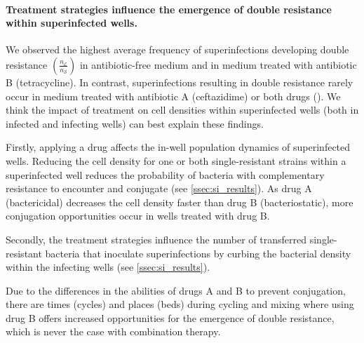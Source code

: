 \paragraph{Treatment strategies influence the emergence of double resistance within superinfected wells.}
We observed the highest average frequency of superinfections developing double resistance $(\frac{n_{\mathcal{E}}}{n_{\mathcal{S}}})$ in antibiotic-free medium and in medium treated with antibiotic B (tetracycline).
In contrast, superinfections resulting in double resistance rarely occur in medium treated with antibiotic A (ceftazidime) or both drugs ().
We think the impact of treatment on cell densities within superinfected wells (both in infected and infecting wells) can best explain these findings.

Firstly, applying a drug affects the in-well population dynamics of superinfected wells.
Reducing the cell density for one or both single-resistant strains within a superinfected well reduces the probability of bacteria with complementary resistance to encounter and conjugate (see \autoref{ssec:si_results}).
As drug A (bactericidal) decreases the cell density faster than drug B (bacteriostatic), more conjugation opportunities occur in wells treated with drug B.

Secondly, the treatment strategies influence the number of transferred single-resistant bacteria that inoculate superinfections by curbing the bacterial density within the infecting wells (see \autoref{ssec:si_results}).

Due to the differences in the abilities of drugs A and B to prevent conjugation, there are times (cycles) and places (beds) during cycling and mixing where using drug B offers increased opportunities for the emergence of double resistance, which is never the case with combination therapy.

